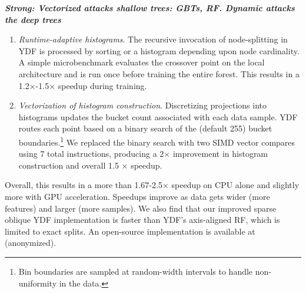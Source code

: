 \documentclass[sigconf,anonymous,review]{acmart}
\begin{document}
\textbf{\textit{Strong: Vectorized attacks shallow trees: GBTs, RF. Dynamic attacks the deep trees}}

\begin{enumerate}
    \item \textit{Runtime-adaptive histograms}. The recursive invocation of node-splitting in YDF is processed by sorting or a histogram depending upon node cardinality. A simple microbenchmark
    evaluates the crossover point on the local architecture and is run once before training the entire forest. This results in a 1.2$\times$-1.5$\times$  speedup during training.

    \item \textit{Vectorization of histogram construction}. Discretizing projections into histograms updates the bucket count associated with each data sample. YDF routes each point based on a binary search of the (default 255) bucket boundaries.\footnote{Bin boundaries are sampled at random-width intervals to handle non-uniformity in the data.} We replaced the binary search with two SIMD vector compares using 7 total instructions, producing a 2$\times$ improvement in histogram construction and overall 1.5 $\times$ speedup.

\end{enumerate}
\noindent Overall, this results in a more than 1.67-2.5$\times$ speedup on CPU alone and slightly more with  GPU acceleration. Speedups improve as data gets wider (more features) and larger (more samples). We also find that our improved sparse oblique YDF implementation is faster than YDF's axis-aligned RF, which is limited to exact splits. An open-source implementation is available at (anonymized). %
\end{document}
